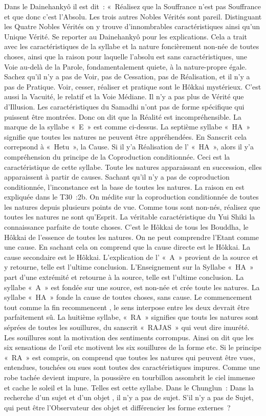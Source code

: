 Dans le Dainehankyô il est dit : « Réalisez que la Souffrance n’est pas Souffrance et que donc c’est l’Absolu. Les trois autres Nobles Vérités sont pareil. Distinguant les Quatre Nobles Vérités on y trouve d’innombrables caractéristiques ainsi qu’un Unique Vérité. Se reporter au Dainehankyô pour les explications.
Cela a trait avec les caractéristiques de la syllabe et la nature foncièrement non-née de toutes choses, ainsi que la raison pour laquelle l’absolu est sans caractéristiques, une Voie au-delà de la Parole, fondamentalement quiete, à la nature-propre égale. Sachez qu’il n’y a pas de Voir, pas de Cessation, pas de Réalisation, et il n’y a pas de Pratique. Voir, cesser, réaliser et pratique sont le Hôkkai mystérieux. C’est aussi la Vacuité, le relatif et la Voie Médiane. Il n’y a pas plus de Vérité que d’Illusion. Les caractéristiques du Samadhi n’ont pas de forme spécifique qui puissent être montrées. Donc on dit que la Réalité est incompréhensible.
La marque de la syllabe « E » est comme ci-dessus. La septième syllabe « HA » signifie que toutes les natures ne peuvent être appréhendées. En Sanscrit cela correpsond à « Hetu », la Cause. Si il y’a Réalisation de l’ « HA », alors il y’a compréhension du principe de la Coproduction conditionnée. Ceci est la caractéristique de cette syllabe.
Toute les natures apparaissant en succession, elles apparaissent à partir de causes. Sachant qu’il n’y a pas de coproduction conditionnée, l’inconstance est la base de toutes les natures. La raison en est expliquée dans le T30 :2b. On médite sur la coproduction conditionnée de toutes les natures depuis plusieurs points de vue. Comme tous sont non-nés, réalisez que toutes les natures ne sont qu’Esprit. La véritable caractéristique du Yui Shiki la connaissance parfaite de toute choses. C’est le Hôkkai de tous les Bouddha, le Hôkkai de l’essence de toutes les natures. On ne peut comprendre l’Etant comme une cause. En sachant cela on comprend que la cause directe est le Hôkkai. La cause secondaire est le Hôkkai.
L’explication de l’ « A » provient de la source et y retourne, telle est l’ultime conclusion. L’Enseignement sur la Syllabe « HA » part d’une extrémité et retourne à la source, telle est l’ultime conclusion. La syllabe « A » est fondée sur une source, est non-née et crée toute les natures. La syllabe « HA » fonde la cause de toutes choses, sans cause. Le commencement tout comme la fin recommencent , le sens interpose entre les deux devrait être parfaitement sû.
La huitième syllabe, « RA » signifies que touts les natures sont séprées de toutes les souillures, du sanscrit « RAJAS » qui veut dire imurété. Les souillures sont la motivation des sentiments corrompus. Ainsi on dit que les six sensations de l’œil etc motivent les six souillures de la forme etc. Si le principe « RA » est compris, on comprend que toutes les natures qui peuvent être vues, entendues, touchées ou sues sont toutes des caractéristiques impures. Comme une robe tachée devient impure, la poussière en tourbillon assombrit le ciel immense et cache le soleil et la lune. Telles est cette syllabe. Dans le Chunglun : Dans la recherche d’un sujet et d’un objet , il n’y a pas de sujet. S’il n’y a pas de Sujet, qui peut être l’Observateur des objet et différencier les forme externes ?
